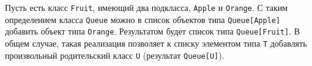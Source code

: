 \documentclass[%
	11pt,
	a4paper,
	utf8,
		]{article}
\begin{document}
Пусть есть класс \texttt{Fruit}, имеющий два подкласса, \texttt{Apple} и \texttt{Orange}. С таким определением класса \texttt{Queue} можно в список объектов типа \texttt{Queue[Apple]} добавить объект типа \texttt{Orange}. Результатом будет список типа \texttt{Queue[Fruit]}. В общем случае, такая реализация позволяет к списку элементом типа \texttt{T} добавлять произвольный родительский класс \texttt{U} (результат \texttt{Queue[U]}).





\begin{thebibliography}{99}
	
\end{thebibliography}
\end{document}
